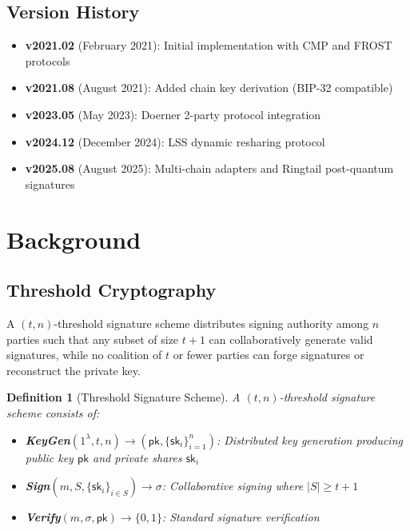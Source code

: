 \documentclass[11pt,twocolumn]{article}
\newtheorem{definition}{Definition}
\begin{document}
\subsection{Version History}

\begin{itemize}
\item \textbf{v2021.02} (February 2021): Initial implementation with CMP and FROST protocols
\item \textbf{v2021.08} (August 2021): Added chain key derivation (BIP-32 compatible)
\item \textbf{v2023.05} (May 2023): Doerner 2-party protocol integration
\item \textbf{v2024.12} (December 2024): LSS dynamic resharing protocol
\item \textbf{v2025.08} (August 2025): Multi-chain adapters and Ringtail post-quantum signatures
\end{itemize}

\section{Background}

\subsection{Threshold Cryptography}

A $(t,n)$-threshold signature scheme distributes signing authority among $n$ parties such that any subset of size $t+1$ can collaboratively generate valid signatures, while no coalition of $t$ or fewer parties can forge signatures or reconstruct the private key.

\begin{definition}[Threshold Signature Scheme]
A $(t,n)$-threshold signature scheme consists of:
\begin{itemize}
\item \textbf{KeyGen}$(1^\lambda, t, n) \to (\textsf{pk}, \{\textsf{sk}_i\}_{i=1}^n)$: Distributed key generation producing public key $\textsf{pk}$ and private shares $\textsf{sk}_i$
\item \textbf{Sign}$(m, S, \{\textsf{sk}_i\}_{i \in S}) \to \sigma$: Collaborative signing where $|S| \geq t+1$
\item \textbf{Verify}$(m, \sigma, \textsf{pk}) \to \{0,1\}$: Standard signature verification
\end{itemize}
\end{definition}
\end{document}
